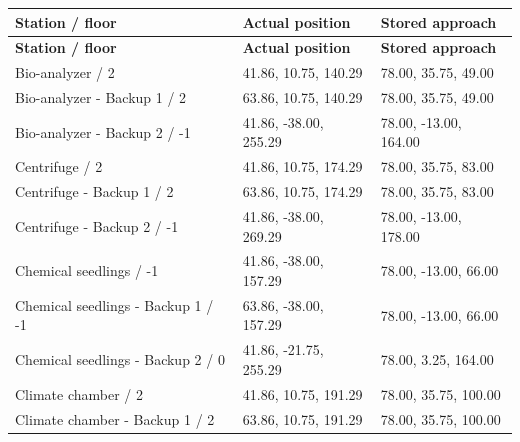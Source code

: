 \begin{longtable}{p{}p{}p{}}
\toprule
\textbf{Station /\allowbreak{} floor} & \textbf{Actual position} & \textbf{Stored approach} \\ \midrule
\endfirsthead
\textbf{Station /\allowbreak{} floor} & \textbf{Actual position} & \textbf{Stored approach} \\ \midrule
\endhead
Bio-analyzer /\allowbreak{} 2 & 41.\allowbreak{}86, 10.\allowbreak{}75, 140.\allowbreak{}29 & 78.\allowbreak{}00, 35.\allowbreak{}75, 49.\allowbreak{}00 \\
Bio-analyzer - Backup 1 /\allowbreak{} 2 & 63.\allowbreak{}86, 10.\allowbreak{}75, 140.\allowbreak{}29 & 78.\allowbreak{}00, 35.\allowbreak{}75, 49.\allowbreak{}00 \\
Bio-analyzer - Backup 2 /\allowbreak{} -1 & 41.\allowbreak{}86, -38.\allowbreak{}00, 255.\allowbreak{}29 & 78.\allowbreak{}00, -13.\allowbreak{}00, 164.\allowbreak{}00 \\
Centrifuge /\allowbreak{} 2 & 41.\allowbreak{}86, 10.\allowbreak{}75, 174.\allowbreak{}29 & 78.\allowbreak{}00, 35.\allowbreak{}75, 83.\allowbreak{}00 \\
Centrifuge - Backup 1 /\allowbreak{} 2 & 63.\allowbreak{}86, 10.\allowbreak{}75, 174.\allowbreak{}29 & 78.\allowbreak{}00, 35.\allowbreak{}75, 83.\allowbreak{}00 \\
Centrifuge - Backup 2 /\allowbreak{} -1 & 41.\allowbreak{}86, -38.\allowbreak{}00, 269.\allowbreak{}29 & 78.\allowbreak{}00, -13.\allowbreak{}00, 178.\allowbreak{}00 \\
Chemical seedlings /\allowbreak{} -1 & 41.\allowbreak{}86, -38.\allowbreak{}00, 157.\allowbreak{}29 & 78.\allowbreak{}00, -13.\allowbreak{}00, 66.\allowbreak{}00 \\
Chemical seedlings - Backup 1 /\allowbreak{} -1 & 63.\allowbreak{}86, -38.\allowbreak{}00, 157.\allowbreak{}29 & 78.\allowbreak{}00, -13.\allowbreak{}00, 66.\allowbreak{}00 \\
Chemical seedlings - Backup 2 /\allowbreak{} 0 & 41.\allowbreak{}86, -21.\allowbreak{}75, 255.\allowbreak{}29 & 78.\allowbreak{}00, 3.\allowbreak{}25, 164.\allowbreak{}00 \\
Climate chamber /\allowbreak{} 2 & 41.\allowbreak{}86, 10.\allowbreak{}75, 191.\allowbreak{}29 & 78.\allowbreak{}00, 35.\allowbreak{}75, 100.\allowbreak{}00 \\
Climate chamber - Backup 1 /\allowbreak{} 2 & 63.\allowbreak{}86, 10.\allowbreak{}75, 191.\allowbreak{}29 & 78.\allowbreak{}00, 35.\allowbreak{}75, 100.\allowbreak{}00 \\

\end{longtable}
